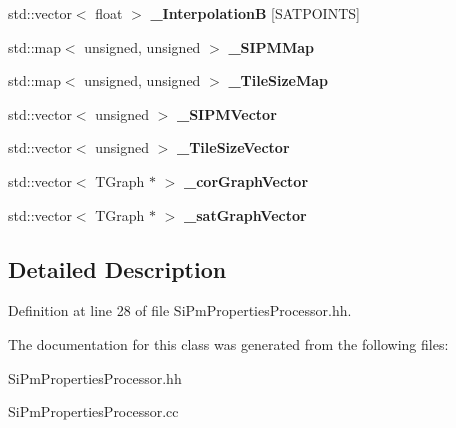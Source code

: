 \begin{DoxyCompactItemize}
\item 
std\-::vector$<$ float $>$ {\bfseries \-\_\-\-Interpolation\-B} [S\-A\-T\-P\-O\-I\-N\-T\-S]\label{classCALICE_1_1SiPmPropertiesProcessor_a6140eb844de35c9d12005f07ca703bf2}

\item 
std\-::map$<$ unsigned, unsigned $>$ {\bfseries \-\_\-\-S\-I\-P\-M\-Map}\label{classCALICE_1_1SiPmPropertiesProcessor_a74ce5786f56b407136f1296c52186217}

\item 
std\-::map$<$ unsigned, unsigned $>$ {\bfseries \-\_\-\-Tile\-Size\-Map}\label{classCALICE_1_1SiPmPropertiesProcessor_a2809f9f20605f6b9e45413fdd366acc8}

\item 
std\-::vector$<$ unsigned $>$ {\bfseries \-\_\-\-S\-I\-P\-M\-Vector}\label{classCALICE_1_1SiPmPropertiesProcessor_a4b3c0339d341c2644acd956c3c94ae30}

\item 
std\-::vector$<$ unsigned $>$ {\bfseries \-\_\-\-Tile\-Size\-Vector}\label{classCALICE_1_1SiPmPropertiesProcessor_ae794aaa1cbba31e6b41928f2c39c2110}

\item 
std\-::vector$<$ T\-Graph $\ast$ $>$ {\bfseries \-\_\-cor\-Graph\-Vector}\label{classCALICE_1_1SiPmPropertiesProcessor_a05341072000f27ed32a970efa463dfaf}

\item 
std\-::vector$<$ T\-Graph $\ast$ $>$ {\bfseries \-\_\-sat\-Graph\-Vector}\label{classCALICE_1_1SiPmPropertiesProcessor_ac6fda8c85d1d6883fa424c7d19c26b1c}

\end{DoxyCompactItemize}


\subsection{Detailed Description}


Definition at line 28 of file Si\-Pm\-Properties\-Processor.\-hh.



The documentation for this class was generated from the following files\-:\begin{DoxyCompactItemize}
\item 
Si\-Pm\-Properties\-Processor.\-hh\item 
Si\-Pm\-Properties\-Processor.\-cc\end{DoxyCompactItemize}
